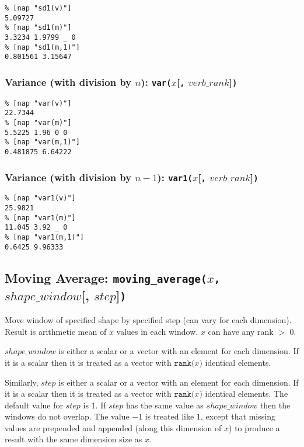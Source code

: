   \begin{verbatim}
% [nap "sd1(v)"]
5.09727
% [nap "sd1(m)"]
3.3234 1.9799 _ 0
% [nap "sd1(m,1)"]
0.801561 3.15647
\end{verbatim}

\subsubsection{Variance (with division by $n$): \texttt{var(}$x$[\texttt{,}
$\mathit{verb\_rank}$]\texttt{)}}
    \label{stat-var}

  \begin{verbatim}
% [nap "var(v)"]
22.7344
% [nap "var(m)"]
5.5225 1.96 0 0
% [nap "var(m,1)"]
0.481875 6.64222
\end{verbatim}

\subsubsection{Variance (with division by $n-1$):
\texttt{var1(}$x$[\texttt{,} $\mathit{verb\_rank}$]\texttt{)}}
    \label{stat-var1}

  \begin{verbatim}
% [nap "var1(v)"]
25.9821
% [nap "var1(m)"]
11.045 3.92 _ 0
% [nap "var1(m,1)"]
0.6425 9.96333
\end{verbatim}

\subsection{Moving Average:
\texttt{moving\_average(}$x$\texttt{,} $\mathit{shape\_window}$[, $\mathit{step}$]\texttt{)}}
    \label{stat-moving-average}

Move window of specified shape by specified step (can vary for
  each dimension). Result is arithmetic mean of 
  $x$ values in each window. 
  $x$ can have any rank $>$ 0.

$\mathit{shape\_window}$ is either a scalar or a vector with an
element for each dimension. If it is a scalar then it is treated as a vector with 
$\texttt{rank(}x\texttt{)}$
identical elements.

Similarly, $\mathit{step}$ is either a scalar or a vector with an element for
each dimension. If it is a scalar then it is treated as a vector with
$\texttt{rank(}x\texttt{)}$
identical elements.
The default value for $\mathit{step}$ is 1.
If $\mathit{step}$ has the same value as 
$\mathit{shape\_window}$ then the windows do not overlap. The value $-1$
is treated like $1$, except that missing values are prepended and
appended (along this dimension of 
$x$) to produce a result with the same dimension size as $x$.


